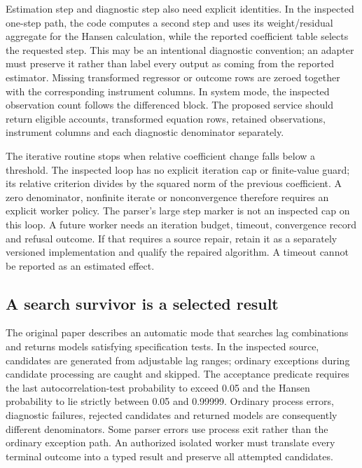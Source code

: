 Estimation step and diagnostic step also need explicit identities. In the inspected
one-step path, the code computes a second step and uses its weight/residual aggregate
for the Hansen calculation, while the reported coefficient table selects the requested
step. This may be an intentional diagnostic convention; an adapter must preserve it
rather than label every output as coming from the reported estimator. Missing transformed
regressor or outcome rows are zeroed together with the corresponding instrument columns.
In system mode, the inspected observation count follows the differenced block. The
proposed service should return eligible accounts, transformed equation rows, retained
observations, instrument columns and each diagnostic denominator separately.
\citep{exec24_pydynpd_source}

The iterative routine stops when relative coefficient change falls below a threshold.
The inspected loop has no explicit iteration cap or finite-value guard; its relative
criterion divides by the squared norm of the previous coefficient. A zero denominator,
nonfinite iterate or nonconvergence therefore requires an explicit worker policy.
The parser's large step marker is not an inspected cap on this loop. A future worker
needs an iteration budget, timeout, convergence record and refusal outcome. If that
requires a source repair, retain it as a separately versioned implementation and
qualify the repaired algorithm. A timeout cannot be reported as an estimated effect.
\citep{exec24_pydynpd_source}

\subsection{A search survivor is a selected result}
The original paper describes an automatic mode that searches lag combinations and
returns models satisfying specification tests. In the inspected source, candidates
are generated from adjustable lag ranges; ordinary exceptions during candidate
processing are caught and skipped. The acceptance predicate requires the last
autocorrelation-test probability to exceed 0.05 and the Hansen probability to lie
strictly between 0.05 and 0.99999. Ordinary process errors, diagnostic failures,
rejected candidates and returned models are consequently different denominators.
Some parser errors use process exit rather than the ordinary exception path.
An authorized isolated worker must translate every terminal outcome into a typed
result and preserve all attempted candidates.\citep{exec24_pydynpd_paper,exec24_pydynpd_source}

